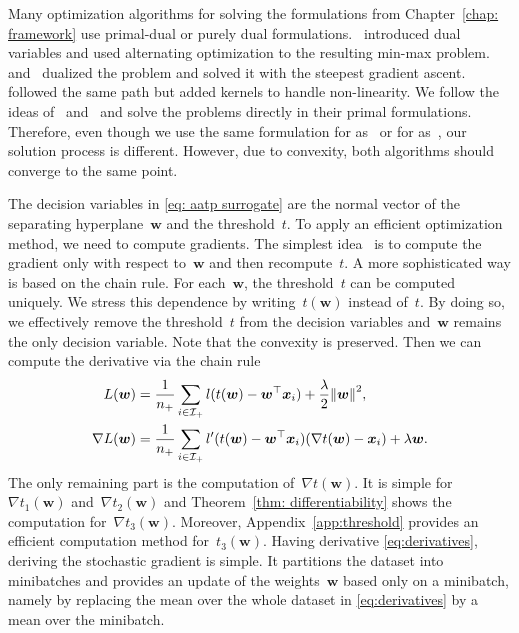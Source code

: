 Many optimization algorithms for solving the formulations from Chapter~\ref{chap: framework} use primal-dual or purely dual formulations.~\cite{eban2017scalable} introduced dual variables and used alternating optimization to the resulting min-max problem. ~\cite{li2014top} and~\cite{zhang2018tau} dualized the problem and solved it with the steepest gradient ascent.~\cite{macha2020nonlinear} followed the same path but added kernels to handle non-linearity. We follow the ideas of~\cite{mackey2018constrained} and~\cite{adam2019machine} and solve the problems directly in their primal formulations. Therefore, even though we use the same formulation for \TopPush as~\cite{li2014top} or for \tauFPL as~\cite{zhang2018tau}, our solution process is different. However, due to convexity, both algorithms should converge to the same point.

The decision variables in \eqref{eq: aatp surrogate} are the normal vector of the separating hyperplane~$\bm{w}$ and the threshold~$t$. To apply an efficient optimization method, we need to compute gradients. The simplest idea~\cite{grill2016learning} is to compute the gradient only with respect to~$\bm{w}$ and then recompute~$t$. A more sophisticated way is based on the chain rule. For each~$\bm{w}$, the threshold~$t$ can be computed uniquely. We stress this dependence by writing~$t(\bm{w})$ instead of~$t$. By doing so, we effectively remove the threshold~$t$ from the decision variables and~$\bm{w}$ remains the only decision variable. Note that the convexity is preserved. Then we can compute the derivative via the chain rule
\begin{equation}\label{eq:derivatives}
  \begin{aligned}
  L(\bm{w})
    & = \frac{1}{\npos} \sum_{i \in \Ipos} l(t(\bm{w}) - \bm{w}^{\top} \bm{x}_i) + \frac{\lambda}{2}\norm{\bm{w}}^2, \\
  \nabla L(\bm{w})
    & = \frac{1}{\npos} \sum_{i \in \Ipos} l'(t(\bm{w}) - \bm{w}^{\top} \bm{x}_i)(\nabla t(\bm{w}) - \bm{x}_i) + \lambda \bm{w}.
  \end{aligned}
\end{equation}
The only remaining part is the computation of~$\nabla t(\bm{w})$. It is simple for~$\nabla t_1(\bm{w})$ and~$\nabla t_2(\bm{w})$ and Theorem~\ref{thm: differentiability} shows the computation for~$\nabla t_3(\bm{w})$. Moreover, Appendix~\ref{app:threshold} provides an efficient computation method for~$t_3(\bm{w})$. Having derivative \eqref{eq:derivatives}, deriving the stochastic gradient is simple. It partitions the dataset into minibatches and provides an update of the weights~$\bm{w}$ based only on a minibatch, namely by replacing the mean over the whole dataset in \eqref{eq:derivatives} by a mean over the minibatch.

